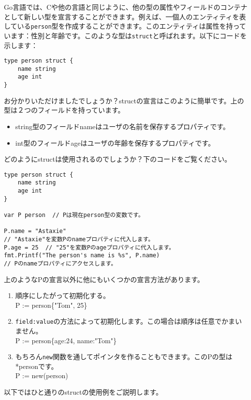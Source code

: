 Go言語では、Cや他の言語と同じように、他の型の属性やフィールドのコンテナとして新しい型を宣言することができます。例えば、一個人のエンティティを表している\texttt{person}型を作成することができます。このエンティティは属性を持っています：性別と年齢です。このような型は\texttt{struct}と呼ばれます。以下にコードを示します：

\begin{lstlisting}[numbers=none]
type person struct {
    name string
    age int
}
\end{lstlisting}

お分かりいただけましたでしょうか？structの宣言はこのように簡単です。上の型は２つのフィールドを持っています。

\begin{itemize}
  \item string型のフィールドnameはユーザの名前を保存するプロパティです。
  \item int型のフィールドageはユーザの年齢を保存するプロパティです。
\end{itemize}

どのようにstructは使用されるのでしょうか？下のコードをご覧ください。

\begin{lstlisting}[numbers=none]
type person struct {
    name string
    age int
}

var P person  // Pは現在person型の変数です。

P.name = "Astaxie"
// "Astaxie"を変数Pのnameプロパティに代入します。
P.age = 25  // "25"を変数Pのageプロパティに代入します。
fmt.Printf("The person's name is %s", P.name)
// Pのnameプロパティにアクセスします。
\end{lstlisting}

上のようなPの宣言以外に他にもいくつかの宣言方法があります。

\begin{enumerate}
  \item 順序にしたがって初期化する。\\ P := person\{"Tom", 25\}
  \item \texttt{field:value}の方法によって初期化します。この場合は順序は任意でかまいません。\\ P := person\{age:24, name:"Tom"\}
  \item もちろん\texttt{new}関数を通してポインタを作ることもできます。このPの型は*personです。\\ P := new(person)
\end{enumerate}

以下ではひと通りのstructの使用例をご説明します。

